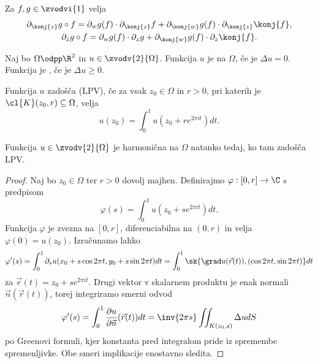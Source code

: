 
\begin{trditev}
  Za $f, g \in \zvodvi{1}$ velja
  \begin{gather*}
	\partial_{\konj{z}} g\circ f
	= \partial_w g(f) \cdot \partial_{\konj{z}} f
	+ \partial_{\konj{w}} g(f) \cdot \partial_{\konj{z}} \konj{f}, \\
	\partial_z g \circ f
	= \partial_w g(f) \cdot \partial_{z} g
	+ \partial_{\konj{w}} g(f) \cdot \partial_z \konj{f}.
  \end{gather*}
\end{trditev}

\begin{definicija}
  Naj bo $\Omega \odpp \R^2$ in $u \in \zvodv{2}{\Omega}$.
  Funkcija $u$ je  na $\Omega$, če je $\Delta u = 0$.
  Funkcija je , če je $\Delta u \ge 0$.
\end{definicija}

\begin{definicija}
  Funkcija $u$ zadošča  (LPV), če za vsak
  $z_0 \in \Omega$ in $r > 0$, pri katerih je $\cl{K}(z_0, r) \subseteq \Omega$,
  velja
  \[
	u(z_0) = \int_0^1 u(z_0 + r e^{2 \pi i t}) dt.
  \]
\end{definicija}

\begin{izrek}
  Funkcija $u \in \zvodv{2}{\Omega}$ je harmonična na $\Omega$ natanko tedaj, ko
  tam zadošča LPV.
\end{izrek}

\begin{proof}
  Naj bo $z_0 \in \Omega$ ter $r > 0$ dovolj majhen.
  Definirajmo $\varphi: [0,r] \to \C$ s predpisom
  \[
	\varphi(s) = \int_0^1 u(z_0 + s e^{2 \pi i t}) dt.
  \]
  Funkcija $\varphi$ je zvezna na $[0,r]$, diferenciabilna na $(0,r)$ in velja
  $\varphi(0) = u(z_0)$.
  Izračunamo lahko
  \[
	\varphi'(s)
	= \int_0^1 \partial_s u(x_0 + s \cos 2 \pi t, y_0 + s \sin 2 \pi t) dt
	= \int_0^1 \sk{\grad u(\vec{r}(t)), (\cos 2 \pi t, \sin 2 \pi t)} dt
  \]
  za $\vec{r}(t) = z_0 + s e^{2 \pi i t}$.
  Drugi vektor v skalarnem produktu je enak normali $\vec{n}(\vec{r}(t))$, torej
  integriramo smerni odvod
  \[
	\varphi'(s)
	= \int_0^1 \frac{\partial u}{\partial \vec{n}} (\vec{r}(t)) dt
	= \inv{2 \pi s} \iint_{K(z_0, s)} \Delta u dS
  \]
  po Greenovi formuli, kjer konstanta pred integralom pride iz spremembe
  spremenljivke.
  Obe smeri implikacije enostavno sledita.
\end{proof}


